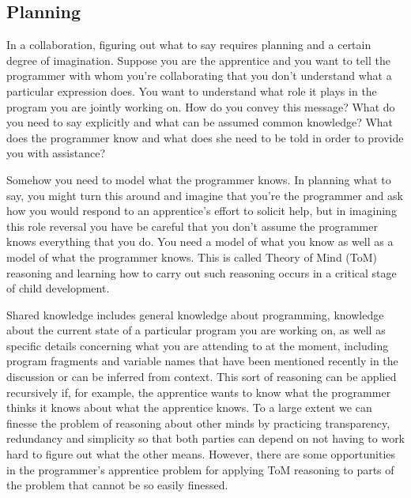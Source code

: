 
\subsection{Planning}


In a collaboration, figuring out what to say requires planning and a certain degree of imagination. Suppose you are the apprentice and you want to tell the programmer with whom you're collaborating that you don't understand what a particular expression does. You want to understand what role it plays in the program you are jointly working on. How do you convey this message? What do you need to say explicitly and what can be assumed common knowledge? What does the programmer know and what does she need to be told in order to provide you with assistance?

Somehow you need to model what the programmer knows. In planning what to say, you might turn this around and imagine that you're the programmer and ask how you would respond to an apprentice's effort to solicit help, but in imagining this role reversal you have be careful that you don't assume the programmer knows everything that you do. You need a model of what you know as well as a model of what the programmer knows. This is called Theory of Mind (ToM) reasoning and learning how to carry out such reasoning occurs in a critical stage of child development.

Shared knowledge includes general knowledge about programming, knowledge about the current state of a particular program you are working on, as well as specific details concerning what you are attending to at the moment, including program fragments and variable names that have been mentioned recently in the discussion or can be inferred from context. This sort of reasoning can be applied recursively if, for example, the apprentice wants to know what the programmer thinks it knows about what the apprentice knows. To a large extent we can finesse the problem of reasoning about other minds by practicing transparency, redundancy and simplicity so that both parties can depend on not having to work hard to figure out what the other means. However, there are some opportunities in the programmer's apprentice problem for applying ToM reasoning to parts of the problem that cannot be so easily finessed.

